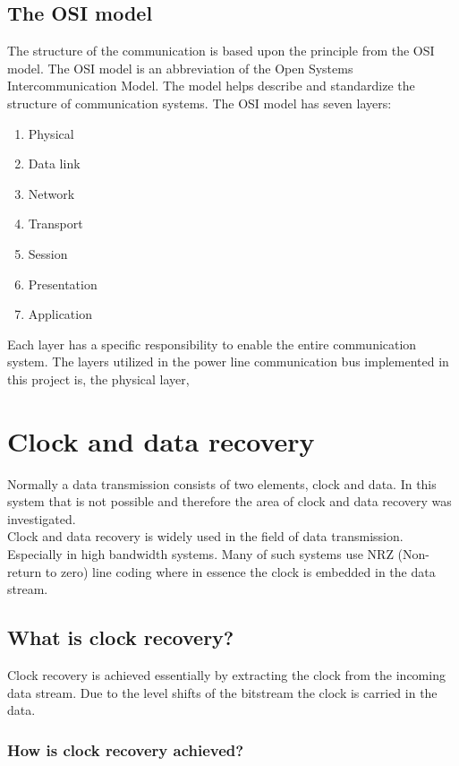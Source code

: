 \subsection{The OSI model}
The structure of the communication is based upon the principle from the OSI model. The OSI model is an abbreviation of the Open Systems Intercommunication Model. The model helps describe and standardize the structure of communication systems. The OSI model has seven layers:
\begin{enumerate}
	\item Physical
	\item Data link
	\item Network
	\item Transport
	\item Session
	\item Presentation
	\item Application
\end{enumerate}

Each layer has a specific responsibility to enable the entire communication system. The layers utilized in the power line communication bus implemented in this project is, the physical layer, 


\section{Clock and data recovery}
Normally a data transmission consists of two elements, clock and data. In this system that is not possible and therefore the area of clock and data recovery was investigated.\\
Clock and data recovery is widely used in the field of data transmission. Especially in high bandwidth systems. Many of such systems use NRZ (Non-return to zero) line coding where in essence the clock is embedded in the data stream.

\subsection{What is clock recovery?}
Clock recovery is achieved essentially by extracting the clock from the incoming data stream. Due to the level shifts of the bitstream the clock is carried in the data.

\subsubsection{How is clock recovery achieved?}

